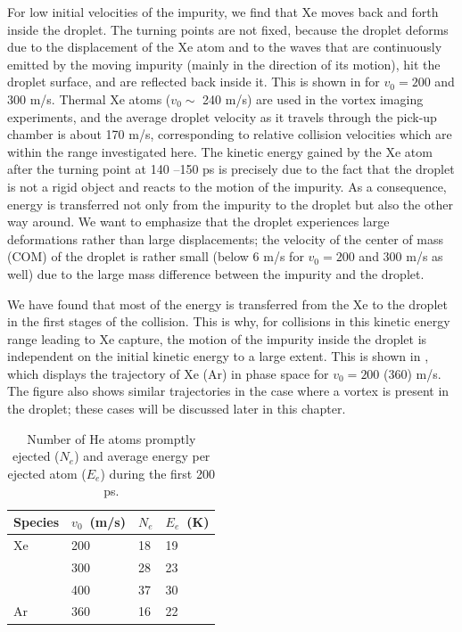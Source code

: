 For low initial velocities of the impurity, we find that
Xe moves back and forth inside the droplet.
The turning points are not fixed,
because the droplet deforms due to the displacement 
of the Xe atom and to the waves that are continuously emitted 
by the moving impurity
(mainly in the direction of its  motion),
hit the droplet surface, and are reflected back inside it\citep{Coppens2017-1}.
This is shown in 
 for $v_0= 200$  and 300 m/s. 
Thermal Xe atoms ($v_0 \sim$ 240 m/s) 
are used in the vortex imaging 
experiments\citep{Gom14,Jones2016}, and the average droplet velocity 
as it travels through the pick-up chamber is about 
170 m/s\citep{Gom11}, corresponding to relative collision
velocities which are within the range investigated here.
The kinetic energy gained by the Xe atom 
after the turning point at 140 --150 ps
is precisely due to the fact that the droplet is not a rigid 
object and reacts to the motion of the impurity.
As a consequence, energy is transferred not only from the impurity to 
the droplet but also the other way around. 
We want to emphasize that the droplet experiences 
large deformations rather than 
large displacements;
the velocity of the center of mass (COM) of the droplet is 
rather small (below 6 m/s  for $v_0= 200$ and 300 m/s as well) 
due to the large 
mass difference between the impurity and the droplet.

We have found that most of the energy is transferred from 
the Xe to the droplet in the first stages of the collision.
This is why, for collisions in this kinetic energy range 
leading to Xe capture, the motion of the impurity inside the droplet
is independent on the initial kinetic energy to a large extent.  
This is shown in , which displays the trajectory
of Xe (Ar) in phase space for $v_0= 200$ (360) m/s. 
The figure also shows similar trajectories in the case where a vortex 
is present in the droplet; these cases will be discussed later in this chapter.

\begin{table}
	\caption{\label{tab1} Number of He atoms promptly ejected ($N_e$) and average energy per ejected atom ($E_e$) during the first 200 ps.}
	\begin{tabu} to \textwidth {X[c]X[c]X[c]X[c]}
		\toprule
		Species & $v_0$~(m/s) & $N_e$ & $E_e$~(K) \\
		\midrule
		Xe & 200 & 18 & 19 \\
		& 300 & 28 & 23   \\
		& 400 & 37 & 30 \\
		\midrule
		Ar & 360 & 16 & 22 \\
		\bottomrule 
	\end{tabu}
\end{table}

